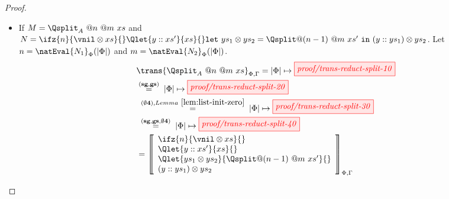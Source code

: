 \begin{proof}
\begin{itemize}
        \item If $M = \Qsplit_A\ @n\ @m\ xs$ and \(N=
            \ifz{n}{\vnil\otimes xs}{}
            \Qlet{y :: xs'}{xs}{}
            \mathtt{let\ } ys_1\otimes ys_2 = \Qsplit @(n-1)\ @m\ xs' \mathtt{\ in\ }
            (y :: ys_1)\otimes ys_2
            \). Let $n = \natEval{N_1}_\Phi(|\Phi|)$ and $m = \natEval{N_2}_\Phi(|\Phi|)$.
            \begin{align*}
                &\trans{\Qsplit_A\ @n\ @m\ xs}_{\Phi,\Gamma}
                = |\Phi|\mapsto\tikzfig{proof/trans-reduct-split-10}\\
                &\overset{\scriptstyle{{\bf(sg,gs)}}}{=}\;|\Phi|\mapsto\tikzfig{proof/trans-reduct-split-20}\\
                &\;\overset{\scriptstyle{{\bf(\emptyset 4)},Lemma~\ref{lem:list-init-zero}}}{=}\;
                |\Phi|\mapsto\tikzfig{proof/trans-reduct-split-30}\\
                &\;\overset{\scriptstyle{{\bf(sg,gs,\emptyset 4)}}}{=}\;
                |\Phi|\mapsto\tikzfig{proof/trans-reduct-split-40}\\
                &= \left\llbracket\begin{array}{l}
                    \ifz{n}{\vnil\otimes xs}{}\\
                    \Qlet{y :: xs'}{xs}{} \\
                    \Qlet{ys_1\otimes ys_2}{\Qsplit @(n-1)\ @m\ xs'}{}\\
                    (y :: ys_1)\otimes ys_2
                \end{array}\right\rrbracket_{\Phi,\Gamma}
            \end{align*}
            

\end{itemize}
\end{proof}
